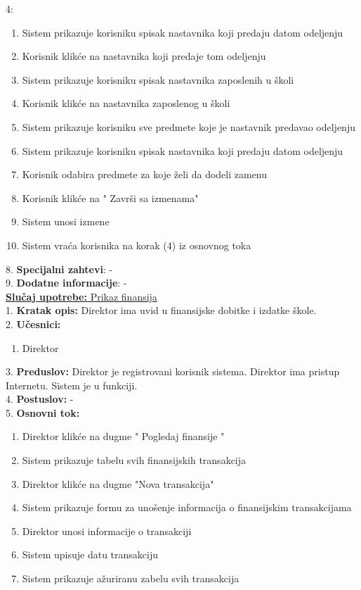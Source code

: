 \documentclass{article}
\begin{document}
4: \\
\begin{enumerate}
\item Sistem prikazuje korisniku spisak nastavnika koji predaju datom odeljenju
\item Korisnik klikće na nastavnika koji predaje tom odeljenju
\item Sistem prikazuje korisniku spisak nastavnika zaposlenih u školi
\item Korisnik klikće na nastavnika zaposlenog u školi
\item Sistem prikazuje korisniku sve predmete koje je nastavnik predavao odeljenju
\item Sistem prikazuje korisniku spisak nastavnika koji predaju datom odeljenju
\item Korisnik odabira predmete za koje želi da dodeli zamenu
\item Korisnik klikće na  " {Završi} sa izmenama"
\item Sistem unosi izmene
\item Sistem vraća korisnika na korak (4) iz osnovnog toka
\end{enumerate}

8. \textbf{Specijalni zahtevi}: - \\

9. \textbf{Dodatne informacije}: - \\


\underline{\textbf{Slučaj upotrebe:} Prikaz finansija} \\

1. \textbf{Kratak opis:}  Direktor ima uvid u finansijske dobitke i izdatke škole. \\

2. \textbf{Učesnici:}
\begin{enumerate} 
\item Direktor
\end{enumerate} 

3. \textbf{Preduslov:} Direktor je registrovani korisnik sistema. Direktor ima pristup Internetu. Sistem je u funkciji. \\

4. \textbf{Postuslov:}  - \\

5. \textbf{Osnovni tok:} 
\begin{enumerate} 
\item Direktor klikće na dugme " {Pogledaj finansije} " 
\item Sistem prikazuje tabelu svih finansijskih transakcija
\item Direktor klikće na dugme "{Nova transakcija}"
\item Sistem prikazuje formu za unošenje informacija o finansijskim transakcijama
\item Direktor unosi informacije o transakciji
\item Sistem upisuje datu transakciju
\item Sistem prikazuje ažuriranu zabelu svih transakcija
\end{enumerate}
\end{document}
